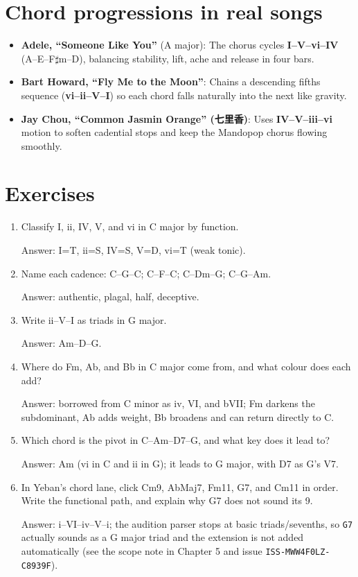 \section{Chord progressions in real songs}

\begin{itemize}
  \item \textbf{Adele, ``Someone Like You''} (A major): The chorus cycles \textbf{I--V--vi--IV} (A--E--F$\sharp$m--D), balancing stability, lift, ache and release in four bars.
  \item \textbf{Bart Howard, ``Fly Me to the Moon''}: Chains a descending fifths sequence (\textbf{vi--ii--V--I}) so each chord falls naturally into the next like gravity.
  \item \textbf{Jay Chou, ``Common Jasmin Orange'' (七里香)}: Uses \textbf{IV--V--iii--vi} motion to soften cadential stops and keep the Mandopop chorus flowing smoothly.
\end{itemize}

\section{Exercises}


\begin{exercise}
\begin{enumerate}
  \item Classify I, ii, IV, V, and vi in C major by function.
  \par\noindent Answer: I=T, ii=S, IV=S, V=D, vi=T (weak tonic).
  \item Name each cadence: C--G--C; C--F--C; C--Dm--G; C--G--Am.
  \par\noindent Answer: authentic, plagal, half, deceptive.
  \item Write ii--V--I as triads in G major.
  \par\noindent Answer: Am--D--G.
  \item Where do Fm, Ab, and Bb in C major come from, and what colour does each add?
  \par\noindent Answer: borrowed from C minor as iv, VI, and bVII; Fm darkens the subdominant, Ab adds weight, Bb broadens and can return directly to C.
  \item Which chord is the pivot in C--Am--D7--G, and what key does it lead to?
  \par\noindent Answer: Am (vi in C and ii in G); it leads to G major, with D7 as G's V7.
  \item In Yeban's chord lane, click Cm9, AbMaj7, Fm11, G7, and Cm11 in order. Write the functional path, and explain why G7 does not sound its \sharpsym{}9.
  \par\noindent Answer: i--VI--iv--V--i; the audition parser stops at basic triads/sevenths, so \texttt{G7} actually sounds as a G major triad and the extension is not added automatically (see the scope note in Chapter 5 and issue \texttt{ISS-MWW4F0LZ-C8939F}).
\end{enumerate}
\end{exercise}

